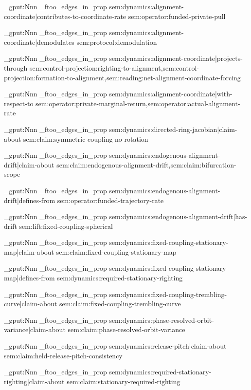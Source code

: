 \prop_gput:Nnn \g_ftoo_edges_in_prop { sem:dynamics:alignment-coordinate|contributes-to-coordinate-rate } { sem:operator:funded-private-pull }

\prop_gput:Nnn \g_ftoo_edges_in_prop { sem:dynamics:alignment-coordinate|demodulates } { sem:protocol:demodulation }

\prop_gput:Nnn \g_ftoo_edges_in_prop { sem:dynamics:alignment-coordinate|projects-through } { sem:control-projection:righting-to-alignment,sem:control-projection:formation-to-alignment,sem:reading:net-alignment-coordinate-forcing }

\prop_gput:Nnn \g_ftoo_edges_in_prop { sem:dynamics:alignment-coordinate|with-respect-to } { sem:operator:private-marginal-return,sem:operator:actual-alignment-rate }

\prop_gput:Nnn \g_ftoo_edges_in_prop { sem:dynamics:directed-ring-jacobian|claim-about } { sem:claim:symmetric-coupling-no-rotation }

\prop_gput:Nnn \g_ftoo_edges_in_prop { sem:dynamics:endogenous-alignment-drift|claim-about } { sem:claim:endogenous-alignment-drift,sem:claim:bifurcation-scope }

\prop_gput:Nnn \g_ftoo_edges_in_prop { sem:dynamics:endogenous-alignment-drift|defines-from } { sem:operator:funded-trajectory-rate }

\prop_gput:Nnn \g_ftoo_edges_in_prop { sem:dynamics:endogenous-alignment-drift|has-drift } { sem:lift:fixed-coupling-spherical }

\prop_gput:Nnn \g_ftoo_edges_in_prop { sem:dynamics:fixed-coupling-stationary-map|claim-about } { sem:claim:fixed-coupling-stationary-map }

\prop_gput:Nnn \g_ftoo_edges_in_prop { sem:dynamics:fixed-coupling-stationary-map|defines-from } { sem:dynamics:required-stationary-righting }

\prop_gput:Nnn \g_ftoo_edges_in_prop { sem:dynamics:fixed-coupling-trembling-curve|claim-about } { sem:claim:fixed-coupling-trembling-curve }

\prop_gput:Nnn \g_ftoo_edges_in_prop { sem:dynamics:phase-resolved-orbit-variance|claim-about } { sem:claim:phase-resolved-orbit-variance }

\prop_gput:Nnn \g_ftoo_edges_in_prop { sem:dynamics:release-pitch|claim-about } { sem:claim:held-release-pitch-consistency }

\prop_gput:Nnn \g_ftoo_edges_in_prop { sem:dynamics:required-stationary-righting|claim-about } { sem:claim:stationary-required-righting }

